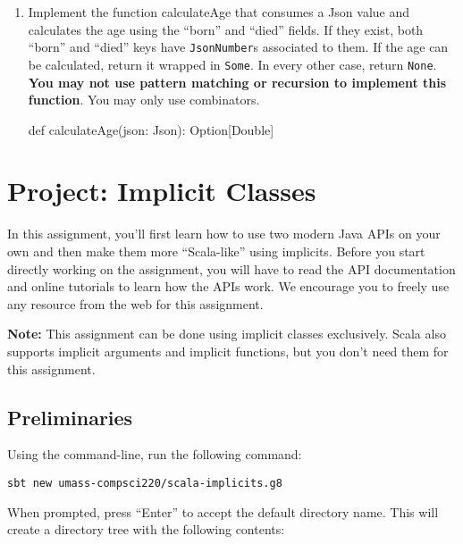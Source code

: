 \documentclass[9pt]{extbook}
\begin{document}
\begin{enumerate}
    \item Implement the function calculateAge that consumes a Json value
    and calculates the age using the ``born'' and ``died'' fields. If they
    exist, both ``born'' and ``died'' keys have \texttt{JsonNumber}s associated
    to them. If the age can be calculated, return it wrapped in \texttt{Some}.
    In every other case, return \texttt{None}. \textbf{You may not use pattern
    matching or recursion to implement this function}. You may only use
    combinators.
    \begin{scalacode}
    def calculateAge(json: Json): Option[Double]
    \end{scalacode}

\end{enumerate}



\chapter{Project: Implicit Classes}

In this assignment, you'll first learn how to use two modern Java APIs on your 
own and then make them more ``Scala-like'' using implicits. Before you start 
directly working on the assignment, you will have to read the API documentation 
and online tutorials to learn how the APIs work. We encourage you to freely use
 any resource from the web for this assignment.

\textbf{Note:} This assignment can be done using implicit classes exclusively. 
Scala also supports implicit arguments and implicit functions, but you don't 
need them for this assignment.

\section{Preliminaries}

Using the command-line, run the following command:

\begin{lstlisting}
sbt new umass-compsci220/scala-implicits.g8
\end{lstlisting}

When prompted, press ``Enter'' to accept the default directory name. This will
create a directory tree with the following contents:

\end{document}
